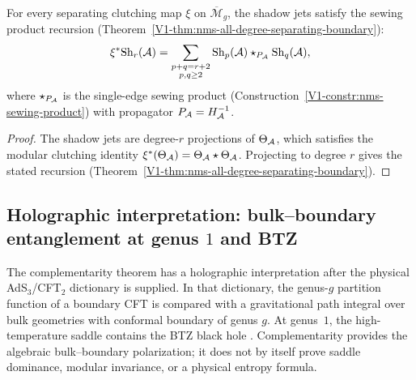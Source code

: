 \begin{proposition}
For every separating clutching map $\xi$ on
$\overline{\mathcal{M}}_g$, the shadow jets satisfy the
sewing product recursion
\textup{(}Theorem~\textup{\ref{V1-thm:nms-all-degree-separating-boundary})}:
\begin{equation}%
\xi^* \Sh_r(\cA)
=
\sum_{\substack{p + q = r + 2 \\ p, q \ge 2}}
\Sh_p(\cA) \star_{P_\cA} \Sh_q(\cA),
\end{equation}
where $\star_{P_{\mathcal{A}}}$ is the single-edge sewing product
\textup{(}Construction~\textup{\ref{V1-constr:nms-sewing-product})}
with propagator $P_{\mathcal{A}} = H_{\mathcal{A}}^{-1}$.
\end{proposition}

\begin{proof}
The shadow jets are degree-$r$ projections of $\Theta_{\mathcal{A}}$,
which satisfies the modular clutching identity
$\xi^*(\Theta_{\mathcal{A}}) = \Theta_{\mathcal{A}} \star \Theta_{\mathcal{A}}$.
Projecting to degree $r$ gives the stated recursion
(Theorem~\ref{V1-thm:nms-all-degree-separating-boundary}).
\end{proof}

%
%

\subsection{Holographic interpretation: bulk--boundary
entanglement at genus $1$ and BTZ}
\label{subsec:thqg-III-holographic-entanglement}

The complementarity theorem has a holographic interpretation after
the physical AdS$_3$/CFT$_2$ dictionary is supplied. In that
dictionary, the genus-$g$ partition function of a boundary CFT is
compared with a gravitational path integral over bulk geometries with
conformal boundary of genus $g$. At genus~$1$, the high-temperature
saddle contains the BTZ black hole \cite{BTZ92}. Complementarity
provides the algebraic bulk--boundary polarization; it does not by
itself prove saddle dominance, modular invariance, or a physical
entropy formula.

